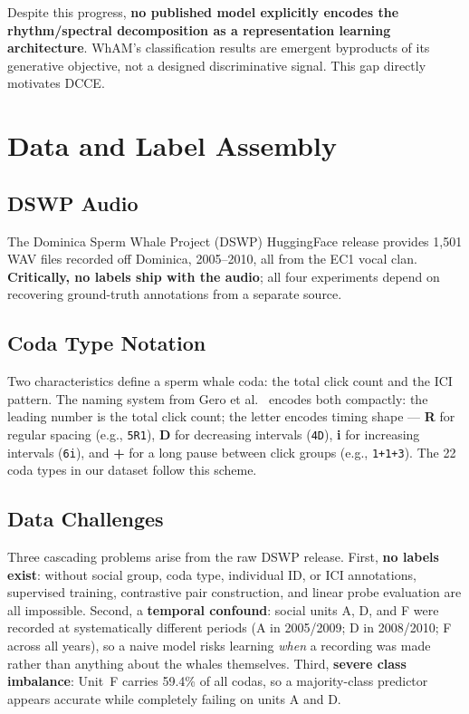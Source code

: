 \documentclass[9pt,a4paper,twocolumn,twoside]{rho-class/rho}
\begin{document}
Despite this progress, \textbf{no published model explicitly encodes the rhythm/spectral decomposition as a representation learning architecture}. WhAM's classification results are emergent byproducts of its generative objective, not a designed discriminative signal. This gap directly motivates DCCE.

\section{Data and Label Assembly}
\label{sec:data}

\subsection{DSWP Audio}

The Dominica Sperm Whale Project (DSWP) HuggingFace release \cite{paradise2025wham} provides 1,501 WAV files recorded off Dominica, 2005--2010, all from the EC1 vocal clan. \textbf{Critically, no labels ship with the audio}; all four experiments depend on recovering ground-truth annotations from a separate source.

\subsection{Coda Type Notation}

Two characteristics define a sperm whale coda: the total click count and the ICI pattern. The naming system from Gero et al.\ \cite{gero2016identity} encodes both compactly: the leading number is the total click count; the letter encodes timing shape --- \textbf{R} for regular spacing (e.g., \texttt{5R1}), \textbf{D} for decreasing intervals (\texttt{4D}), \textbf{i} for increasing intervals (\texttt{6i}), and \textbf{+} for a long pause between click groups (e.g., \texttt{1+1+3}). The 22 coda types in our dataset follow this scheme.

\subsection{Data Challenges}

Three cascading problems arise from the raw DSWP release. First, \textbf{no labels exist}: without social group, coda type, individual ID, or ICI annotations, supervised training, contrastive pair construction, and linear probe evaluation are all impossible. Second, a \textbf{temporal confound}: social units A, D, and F were recorded at systematically different periods (A in 2005/2009; D in 2008/2010; F across all years), so a naive model risks learning \emph{when} a recording was made rather than anything about the whales themselves. Third, \textbf{severe class imbalance}: Unit~F carries 59.4\% of all codas, so a majority-class predictor appears accurate while completely failing on units A and D.
\end{document}
